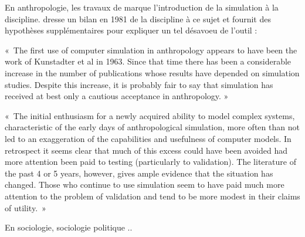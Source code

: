 {En anthropologie, les travaux de \autocite{Kunstadter1963} marque l'introduction de la simulation à la discipline. \autocite{Dyke1981} dresse un bilan en 1981 de la discipline à ce sujet et fournit des hypothèses supplémentaires pour expliquer un tel désavoeu de l'outil : 

« The first use of computer simulation in anthropology appears to have been the work of Kunstadter et al in 1963. Since that time there has been a considerable increase in the number of publications whose results have depended on simulation studies. Despite this increase, it is probably fair to say that simulation has received at best only a cautious acceptance in anthropology. »

« The initial enthusiasm for a newly acquired ability to model complex systems, characteristic of the early days of anthropological simulation, more often than not led to an exaggeration of the capabilities and usefulness of computer models. In retrospect it seems clear that much of this excess could have been avoided had more attention been paid to testing (particularly to validation). The literature of the past 4 or 5 years, however, gives ample evidence that the situation has changed. Those who continue to use simulation seem to have paid much more attention to the problem of validation and tend to be more modest in their claims of utility. »

En sociologie, sociologie politique ..\autocite{Padioleau1969}


}
